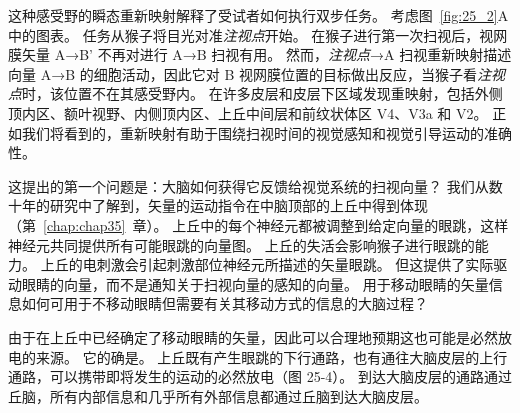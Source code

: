 这种感受野的瞬态重新映射解释了受试者如何执行双步任务。
考虑图~\ref{fig:25_2}A 中的图表。
任务从猴子将目光对准\textit{注视点}开始。
在猴子进行第一次扫视后，视网膜矢量 A→B' 不再对进行 A→B 扫视有用。
然而，\textit{注视点}→A 扫视重新映射描述向量 A→B 的细胞活动，因此它对 B 视网膜位置的目标做出反应，当猴子看\textit{注视点}时，该位置不在其感受野内。
在许多皮层和皮层下区域发现重映射，包括外侧顶内区、额叶视野、内侧顶内区、上丘中间层和前纹状体区 V4、V3a 和 V2。
正如我们将看到的，重新映射有助于围绕扫视时间的视觉感知和视觉引导运动的准确性。


这提出的第一个问题是：大脑如何获得它反馈给视觉系统的扫视向量？
我们从数十年的研究中了解到，矢量的运动指令在中脑顶部的上丘中得到体现（第~\ref{chap:chap35}~章）。
上丘中的每个神经元都被调整到给定向量的眼跳，这样神经元共同提供所有可能眼跳的向量图。
上丘的失活会影响猴子进行眼跳的能力。
上丘的电刺激会引起刺激部位神经元所描述的矢量眼跳。 
但这提供了实际驱动眼睛的向量，而不是通知关于扫视向量的感知的向量。
用于移动眼睛的矢量信息如何可用于不移动眼睛但需要有关其移动方式的信息的大脑过程？


由于在上丘中已经确定了移动眼睛的矢量，因此可以合理地预期这也可能是必然放电的来源。
它的确是。
上丘既有产生眼跳的下行通路，也有通往大脑皮层的上行通路，可以携带即将发生的运动的必然放电（图 25-4）。
到达大脑皮层的通路通过丘脑，所有内部信息和几乎所有外部信息都通过丘脑到达大脑皮层。


